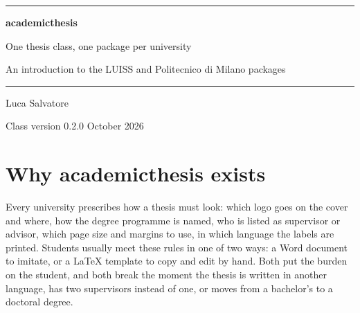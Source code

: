 \documentclass[11pt,a4paper]{article}
\begin{document}
\hypersetup{pageanchor=false}
\begin{titlepage}
  \thispagestyle{empty}
  \vspace*{3cm}
  {\color{docaccent}\rule{\linewidth}{1.2pt}}\par\vspace{14pt}
  {\fontsize{30}{36}\selectfont\bfseries\color{docaccent} academicthesis\par}
  \vspace{10pt}
  {\LARGE One thesis class, one package per university\par}
  \vspace{6pt}
  {\Large An introduction to the LUISS and Politecnico di Milano packages\par}
  \vspace{14pt}
  {\color{docaccent}\rule{\linewidth}{1.2pt}}\par
  \vspace{2cm}
  \begin{center}
    \hspace{1.2cm}%
  \end{center}
  \vfill
  {\large Luca Salvatore\par}
  {\color{docgrey} Class version 0.2.0 \quad\textbullet\quad October 2026\par}
\end{titlepage}
\hypersetup{pageanchor=true}

{\setlength{\parskip}{0pt}\tableofcontents}
\clearpage

\section{Why academicthesis exists}

Every university prescribes how a thesis must look: which logo goes on the
cover and where, how the degree programme is named, who is listed as
supervisor or advisor, which page size and margins to use, in which
language the labels are printed. Students usually meet these rules in one
of two ways: a Word document to imitate, or a \LaTeX{} template to copy and
edit by hand. Both put the burden on the student, and both break the moment
the thesis is written in another language, has two supervisors instead of
one, or moves from a bachelor's to a doctoral degree.
\end{document}
